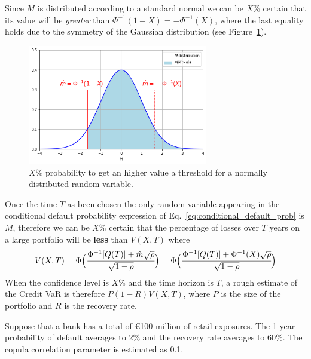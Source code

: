 Since $M$ is distributed according to a standard normal we can be $X\%$ certain that its value will be \emph{greater} than $\Phi^{-1}(1-X)=-\Phi^{-1}(X)$, where the last equality holds due to the symmetry of the Gaussian distribution (see Figure~\ref{fig:certain_for_X}).

\begin{figure}[htb]
	\centering
	\includegraphics[width=0.7\textwidth]{figures/certain_for_X.png}
	\caption{$X\%$ probability to get an higher value a threshold for a normally distributed random variable.}
	\label{fig:certain_for_X}
\end{figure} 

Once the time $T$ as been chosen the only random variable appearing in the conditional default probability expression of Eq.~\ref{eq:conditional_default_prob} is $M$, therefore we can be $X\%$ certain that the percentage of losses over $T$ years on a large portfolio will be \textbf{less} than $V(X,T)$ where
\[
V(X,T)= \Phi\Big(\cfrac{\Phi^{-1}[Q(T)]+\hat{m}\sqrt{\rho}}{\sqrt{1-\rho}}\Big) = \Phi\Big(\cfrac{\Phi^{-1}[Q(T)]+\Phi^{-1}(X)\sqrt{\rho}}{\sqrt{1-\rho}}\Big)
\]
When the confidence level is $X\%$ and the time horizon is $T$, a rough estimate of the Credit VaR is therefore $P(1-R)V(X,T)$, where $P$ is the size of the portfolio and $R$ is the recovery rate.

Suppose that a bank has a total of \euro{100} million of retail exposures. The 1-year probability of default averages to 2\% and the recovery rate averages to 60\%. The copula correlation parameter is estimated as 0.1.

